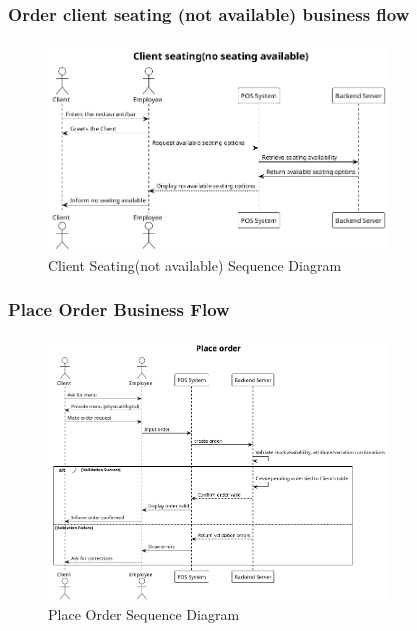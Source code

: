 \documentclass[]{VUMIFTemplateClass}
\begin{document}
\subsubsection{Order client seating (not available) business flow}

\begin{figure}[H]
    \centering
    \includegraphics[width=0.8\textwidth]{images/diagrams/orders/order_client_seating_not_available_sequence.png}
    \caption{Client Seating(not available) Sequence Diagram}
    \label{fig:client_seating_not_available_sequence}
\end{figure}

\subsubsection{Place Order Business Flow}

\begin{figure}[H]
    \centering
    \includegraphics[width=0.8\textwidth]{images/diagrams/orders/order_place_order_sequence.png}
    \caption{Place Order Sequence Diagram}
    \label{fig:place_order_sequence}
\end{figure}
\end{document}
